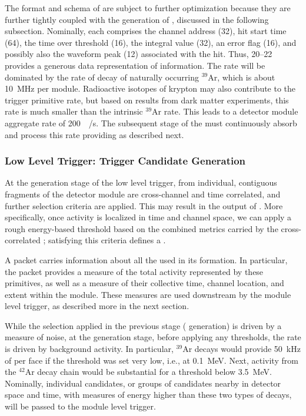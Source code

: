 The format and schema of  are subject to further
optimization because they are further tightly coupled with the generation of
, discussed in the following subsection. Nominally,
each  comprises the channel address (\SI{32}{\bit}), hit
start time (\SI{64}{\bit}), the time over
threshold (\SI{16}{\bit}), the integral  value (\SI{32}{\bit}),
an error flag (\SI{16}{\bit}), and possibly also
the waveform peak (\SI{12}{\bit}) associated with the hit. 
Thus, \SIrange{20}{22}{\byte} provides a generous data
representation of  information. 
The  rate will be dominated by the rate of decay of naturally occurring
$^{39}$Ar, which is about \SI{10}{\mega\hertz} per module. Radioactive
isotopes of krypton may also contribute to the trigger primitive rate,
but based on results from dark matter experiments, this rate is much
smaller than the intrinsic $^{39}$Ar rate. 
This leads to a detector module  aggregate rate of
\SI{200}{\mega\byte/\second}.
The subsequent stage of the  must continuously absorb and process this
rate providing  as described next.

\subsubsection{Low Level Trigger: Trigger Candidate Generation}

At the  generation stage of the low level trigger,
 from individual, contiguous fragments of the
detector 
module are cross-channel and time correlated, and further selection
criteria are applied. This may result in the
output of . 
More specifically, once activity is localized in time and channel
space, we can apply a rough energy-based threshold based on the combined
metrics carried by the cross-correlated ;
satisfying this criteria defines a . 

A  packet carries information about all the   used in its formation. 
In particular, the packet provides a measure of the total activity represented
by these primitives, as well as a measure of their collective time, channel
location, and extent within the module.
These measures are used downstream by the module level trigger, 
as described more in the next section.

While the selection applied in the previous stage (
generation) is driven by a measure of noise, at the 
generation stage, before applying any thresholds, the rate is driven by
background activity.  
In particular, $^{39}$Ar decays would provide \SI{50}{\kilo\hertz} of
 per  face if the threshold was set very low, i.e., at
\SI{0.1}{\MeV}.
Next, activity from the $^{42}$Ar decay chain would be substantial for a
threshold below \SI{3.5}{\MeV}.
Nominally, individual candidates, or groups of candidates nearby in
detector space and time, with measures of energy higher than these two
types of decays, will be passed to the module level trigger. 

